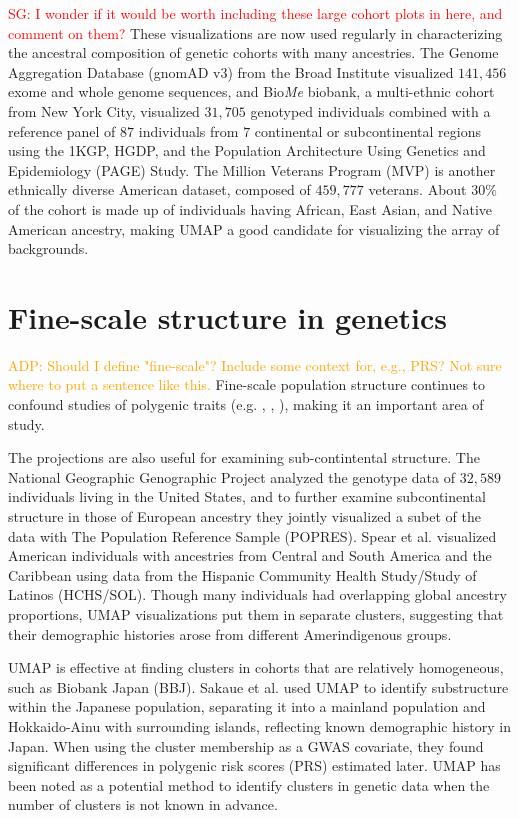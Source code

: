 \documentclass[12pt]{article}
\newcommand{\adpcomment}[1]{{\textcolor{orange}{ADP: #1}}}
\newcommand{\sgcomment}[1]{\textcolor{red}{SG: #1}}
\begin{document}
\sgcomment{I wonder if it would be worth including these large cohort plots in here, and comment on them?}
These visualizations are now used regularly in characterizing the ancestral composition of genetic cohorts with many ancestries. The Genome Aggregation Database (gnomAD v3) from the Broad Institute visualized $141,456$ exome and whole genome sequences\cite{karczewski_mutational_2020}, and Bio\textit{Me} biobank, a multi-ethnic cohort from New York City, visualized $31,705$ genotyped individuals combined with a reference panel of $87$ individuals from $7$ continental or subcontinental regions using the 1KGP, HGDP, and the Population Architecture Using Genetics and Epidemiology (PAGE) Study\cite{matise2011next}. The Million Veterans Program (MVP) is another ethnically diverse American dataset, composed of $459,777$ veterans. About $30\%$ of the cohort is made up of individuals having African, East Asian, and Native American ancestry\cite{hunter-zinck_genotyping_2020}, making UMAP a good candidate for visualizing the array of backgrounds.

\section*{Fine-scale structure in genetics}
\adpcomment{Should I define "fine-scale"? Include some context for, e.g., PRS? Not sure where to put a sentence like this.}
Fine-scale population structure continues to confound studies of polygenic traits (e.g. \cite{kerminen2019geographic}, \cite{berg2019reduced}, \cite{sohail2019polygenic}), making it an important area of study.

The projections are also useful for examining sub-contintental structure. The National Geographic Genographic Project analyzed the genotype data of $32,589$ individuals living in the United States\cite{dai_population_2020}, and to further examine subcontinental structure in those of European ancestry they jointly visualized a subet of the data with The Population Reference Sample (POPRES)\cite{nelson2008population}. Spear et al. visualized American individuals with ancestries from Central and South America and the Caribbean using data from the Hispanic Community Health Study/Study of Latinos (HCHS/SOL)\cite{sorlie2010design}. Though many individuals had overlapping global ancestry proportions, UMAP visualizations put them in separate clusters, suggesting that their demographic histories arose from different Amerindigenous groups\cite{spear2020recent}.

UMAP is effective at finding clusters in cohorts that are relatively homogeneous, such as Biobank Japan (BBJ)\cite{nagai2017overview}. Sakaue et al.\cite{sakaue_dimensionality_2020} used UMAP to identify substructure within the Japanese population, separating it into a mainland population and Hokkaido-Ainu with surrounding islands, reflecting known demographic history in Japan. When using the cluster membership as a GWAS covariate, they found significant differences in polygenic risk scores (PRS) estimated later. UMAP has been noted as a potential method to identify clusters in  genetic data when the number of clusters is not known in advance\cite{tonkin-hill_fast_2019}.
\end{document}
